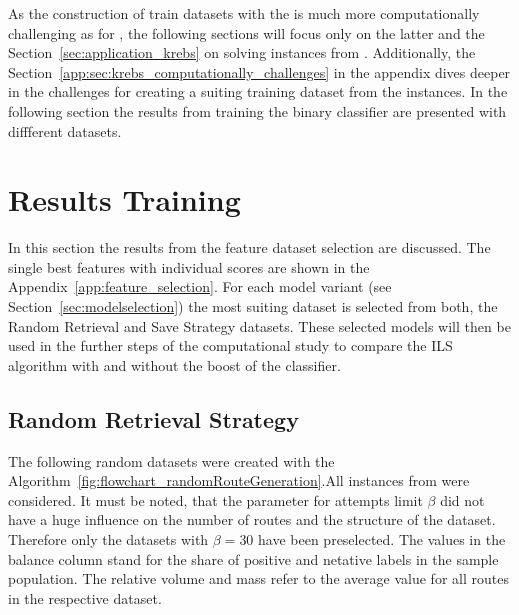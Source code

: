 As the construction of train datasets with the \krebsADataSetText is much more computationally challenging as for \gendreauDataSetText,
the following sections will focus only on the latter and the Section~\ref{sec:application_krebs} on solving instances from \krebsADataSet.
Additionally, the Section~\ref{app:sec:krebs_computationally_challenges} in the appendix dives deeper in the challenges for creating a suiting training dataset from the
\krebsADataSetText instances. In the following section the results from training the binary classifier
are presented with diffferent datasets.

\section{Results Training}
\label{sec:ResultsTraining}
In this section the results from the feature dataset selection are discussed. The single best features
with individual scores are shown in the Appendix~\ref{app:feature_selection}. For each model variant (see Section~\ref{sec:modelselection})
the most suiting dataset is selected from both, the Random Retrieval and Save Strategy datasets. These selected
models will then be used in the further steps of the computational study to compare the \gls{ILS} algorithm
with and without the boost of the classifier.

\subsection{Random Retrieval Strategy}
The following random datasets were created with the Algorithm~\ref{fig:flowchart_randomRouteGeneration}.All instances
from \gendreauDataSetText were considered. It must be noted, that the parameter for attempts limit $\beta$ did not have a huge influence on
the number of routes and the structure of the dataset. Therefore only the datasets with $\beta = 30$ have been preselected.
The values in the balance column stand for the share of positive and netative labels in the sample population. The relative volume
and mass refer to the average value for all routes in the respective dataset.

